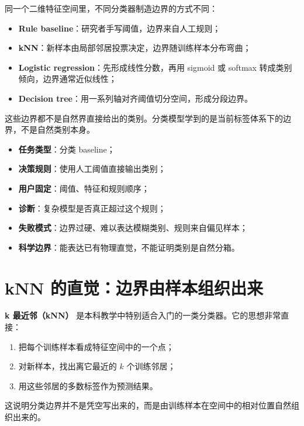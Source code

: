 同一个二维特征空间里，不同分类器制造边界的方式不同：

\begin{itemize}
    \item \textbf{Rule baseline}：研究者手写阈值，边界来自人工规则；
    \item \textbf{kNN}：新样本由局部邻居投票决定，边界随训练样本分布弯曲；
    \item \textbf{Logistic regression}：先形成线性分数，再用 sigmoid 或 softmax 转成类别倾向，边界通常近似线性；
    \item \textbf{Decision tree}：用一系列轴对齐阈值切分空间，形成分段边界。
\end{itemize}

这些边界都不是自然界直接给出的类别。分类模型学到的是当前标签体系下的边界，不是自然类别本身。

\begin{examplebox}
\begin{itemize}
    \item \textbf{任务类型}：分类 baseline；
    \item \textbf{决策规则}：使用人工阈值直接输出类别；
    \item \textbf{用户固定}：阈值、特征和规则顺序；
    \item \textbf{诊断}：复杂模型是否真正超过这个规则；
    \item \textbf{失败模式}：边界过硬、难以表达模糊类别、规则来自偏见样本；
    \item \textbf{科学边界}：能表达已有物理直觉，不能证明类别是自然分箱。
\end{itemize}
\end{examplebox}

\section{kNN 的直觉：边界由样本组织出来}

\textbf{k 最近邻（kNN）} 是本科教学中特别适合入门的一类分类器。它的思想非常直接：

\begin{enumerate}
    \item 把每个训练样本看成特征空间中的一个点；
    \item 对新样本，找出离它最近的 $k$ 个训练邻居；
    \item 用这些邻居的多数标签作为预测结果。
\end{enumerate}

这说明分类边界并不是凭空写出来的，而是由训练样本在空间中的相对位置自然组织出来的。

